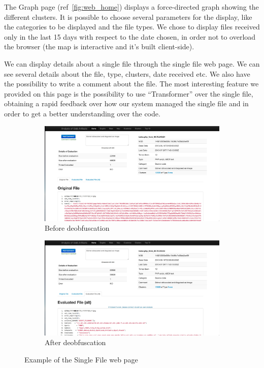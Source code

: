 The Graph page (ref~\ref{fig:web_home}) displays a force-directed graph showing the different clusters. It is possible to choose several parameters for the display, like the categories to be displayed and the file types. We chose to display files received only in the last 15 days with respect to the date chosen, in order not to overload the browser (the map is interactive and it's built client-side).

We can display details about a single file through the single file web page. We can see several details about the file, type, clusters, date received etc. We also have the possibility to write a comment about the file.
The most interesting feature we provided on this page is the possibility to use ``Transformer'' over the single file, obtaining a rapid feedback over how our system managed the single file and in order to get a better understanding over the code.

\begin{figure}
\centering
\begin{subfigure}{.5\textwidth}
  \centering
  \includegraphics[width=1.0\linewidth]{Images/obf_file.jpg}
  \caption{Before deobfuscation}
  \label{fig:sub1}
\end{subfigure}%
\begin{subfigure}{.5\textwidth}
  \centering
  \includegraphics[width=1.0\linewidth]{Images/deobf_file.jpg}
  \caption{After deobfuscation}
  \label{fig:sub2}
\end{subfigure}
\caption{Example of the Single File web page}
\label{fig:test}
\end{figure}
